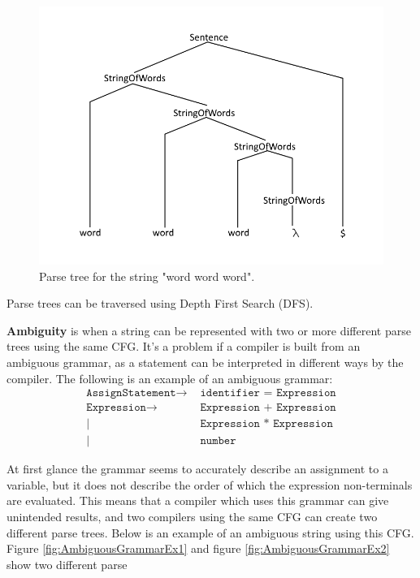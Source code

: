 \begin{figure}[H]
	\centering
	\includegraphics[width=\textwidth/2+\textwidth/4]{3.Theory/images/ParseTree.png}
	\caption{Parse tree for the string "word word word".}
	\label{fig:ParseTreeEx}
\end{figure}

Parse trees can be traversed using Depth First Search (DFS).

\textbf{Ambiguity} is when a string can be represented with two or more different parse trees using the same CFG.
It's a problem if a compiler is built from an ambiguous grammar, as a statement can be interpreted in different ways by the compiler.
The following is an example of an ambiguous grammar:
\begin{align*}
	\texttt{AssignStatement}\to & \texttt{ identifier = Expression}\\
	\texttt{Expression}\to & \texttt{ Expression + Expression}\\
	| & \texttt{ Expression * Expression}\\
	| & \texttt{ number}
\end{align*}

At first glance the grammar seems to accurately describe an assignment to a variable, but it does not describe the order of which the expression non-terminals are evaluated.
This means that a compiler which uses this grammar can give unintended results, and two compilers using the same CFG can create two different parse trees.
Below is an example of an ambiguous string using this CFG.
Figure \ref{fig:AmbiguousGrammarEx1} and figure \ref{fig:AmbiguousGrammarEx2} show two different parse

